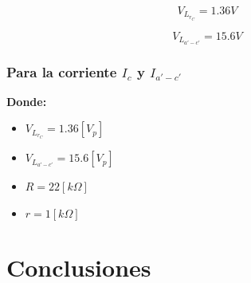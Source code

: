\documentclass[12pt, letterpaper]{article}
\begin{document}
\[ V_{L_{r_C}} = 1.36 V \]

\[ V_{L_{a'-c'}} = 15.6 V \]


\subsubsection*{Para la corriente \(I_{c}\) y \(I_{a'-c'}\)}

\textbf{Donde:}

\begin{itemize}
	\item \(V_{L_{r_C}} = 1.36 [V_p]\)
	\item \(V_{L_{a'-c'}} = 15.6 [V_p]\)
	\item \(R = 22 [k\Omega]\)
	\item \(r = 1 [k\Omega]\)
\end{itemize}





\section{Conclusiones}


\end{document}
